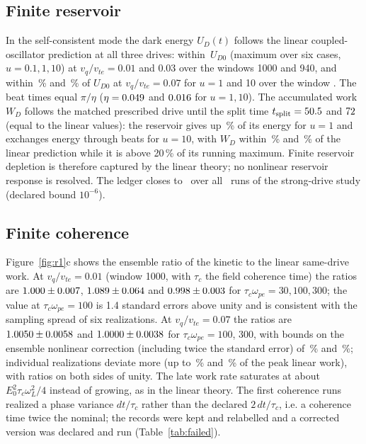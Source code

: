 \documentclass[aps,pre,reprint,floatfix,amsmath,amssymb,nofootinbib,superscriptaddress]{revtex4-2}
\newcommand{\vq}{v_q/v_{te}}
\newcommand{\wpe}{\omega_{pe}}
\begin{document}
\subsection{Finite reservoir}
In the self-consistent mode the dark energy $U_D(t)$ follows the linear coupled-oscillator prediction at all three drives: within \rOneDev\,$U_{D0}$ (maximum over six cases, $u=0.1,1,10$) at $\vq=0.01$ and $0.03$ over the windows 1000 and 940, and within \rnlResO\,\% and \rnlResOZ\,\% of $U_{D0}$ at $\vq=0.07$ for $u=1$ and 10 over the window \winC. The beat times equal $\pi/\eta$ ($\eta=0.049$ and $0.016$ for $u=1,10$). The accumulated work $W_D$ follows the matched prescribed drive until the split time $t_{\rm split}=50.5$ and $72$ (equal to the linear values): the reservoir gives up \rnlWDfrac\,\% of its energy for $u=1$ and exchanges energy through beats for $u=10$, with $W_D$ within \rnlResWO\,\% and \rnlResWOZ\,\% of the linear prediction while it is above 20\,\% of its running maximum. Finite reservoir depletion is therefore captured by the linear theory; no nonlinear reservoir response is resolved. The ledger closes to \rnlLedger\ over all \rnlNruns\ runs of the strong-drive study (declared bound $10^{-6}$).

\subsection{Finite coherence}
Figure~\ref{fig:r1}c shows the ensemble ratio of the kinetic to the linear same-drive work. At $\vq=0.01$ (window 1000, with $\tau_c$ the field coherence time) the ratios are $1.000\pm0.007$, $1.089\pm0.064$ and $0.998\pm0.003$ for $\tau_c\wpe=30,100,300$; the value at $\tau_c\wpe=100$ is 1.4 standard errors above unity and is consistent with the sampling spread of six realizations. At $\vq=0.07$ the ratios are $1.0050\pm0.0058$ and $1.0000\pm0.0038$ for $\tau_c\wpe=100$, 300, with bounds on the ensemble nonlinear correction (including twice the standard error) of \rnlRbOZZ\,\% and \rnlRbHZZ\,\%; individual realizations deviate more (up to \rnlRmaxOZZ\,\% and \rnlRmaxHZZ\,\% of the peak linear work), with ratios on both sides of unity. The late work rate saturates at about $E_0^2\tau_c\omega_L^2/4$ instead of growing, as in the linear theory. The first coherence runs realized a phase variance $dt/\tau_c$ rather than the declared $2\,dt/\tau_c$, i.e. a coherence time twice the nominal; the records were kept and relabelled and a corrected version was declared and run (Table~\ref{tab:failed}).
\end{document}
